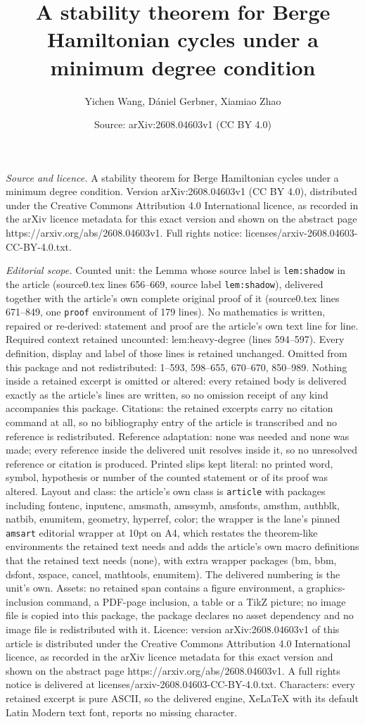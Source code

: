 \documentclass[10pt,a4paper]{amsart}
\title[A stability theorem for Berge Hamiltonian cycles under a min]{A stability theorem for Berge Hamiltonian cycles under a minimum degree condition}
\author{Yichen Wang, D\'aniel Gerbner, Xiamiao Zhao}
\date{Source: arXiv:2608.04603v1 (CC BY 4.0)}
\begin{document}
\maketitle

\noindent\emph{Source and licence.} A stability theorem for Berge Hamiltonian cycles under a minimum degree condition. Version arXiv:2608.04603v1 (CC BY 4.0), distributed under the Creative Commons Attribution 4.0 International licence, as recorded in the arXiv licence metadata for this exact version and shown on the abstract page https://arxiv.org/abs/2608.04603v1. Full rights notice: licenses/arxiv-2608.04603-CC-BY-4.0.txt.\par\smallskip

\noindent\textit{Editorial scope.} Counted unit: the Lemma whose source label is \texttt{lem:shadow} in the article (source0.tex lines 656--669, source label \texttt{lem:shadow}), delivered together with the article's own complete original proof of it (source0.tex lines 671--849, one \texttt{proof} environment of 179 lines). No mathematics is written, repaired or re-derived: statement and proof are the article's own text line for line. Required context retained uncounted: lem:heavy-degree (lines 594--597). Every definition, display and label of those lines is retained unchanged. Omitted from this package and not redistributed: 1--593, 598--655, 670--670, 850--989. Nothing inside a retained excerpt is omitted or altered: every retained body is delivered exactly as the article's lines are written, so no omission receipt of any kind accompanies this package. Citations: the retained excerpts carry no citation command at all, so no bibliography entry of the article is transcribed and no reference is redistributed. Reference adaptation: none was needed and none was made; every reference inside the delivered unit resolves inside it, so no unresolved reference or citation is produced. Printed slips kept literal: no printed word, symbol, hypothesis or number of the counted statement or of its proof was altered. Layout and class: the article's own class is \texttt{article} with packages including fontenc, inputenc, amsmath, amssymb, amsfonts, amsthm, authblk, natbib, enumitem, geometry, hyperref, color; the wrapper is the lane's pinned \texttt{amsart} editorial wrapper at 10pt on A4, which restates the theorem-like environments the retained text needs and adds the article's own macro definitions that the retained text needs (none), with extra wrapper packages (bm, bbm, dsfont, xspace, cancel, mathtools, enumitem). The delivered numbering is the unit's own. Assets: no retained span contains a figure environment, a graphics-inclusion command, a PDF-page inclusion, a table or a TikZ picture; no image file is copied into this package, the package declares no asset dependency and no image file is redistributed with it. Licence: version arXiv:2608.04603v1 of this article is distributed under the Creative Commons Attribution 4.0 International licence, as recorded in the arXiv licence metadata for this exact version and shown on the abstract page https://arxiv.org/abs/2608.04603v1. A full rights notice is delivered at licenses/arxiv-2608.04603-CC-BY-4.0.txt. Characters: every retained excerpt is pure ASCII, so the delivered engine, XeLaTeX with its default Latin Modern text font, reports no missing character.
\end{document}
